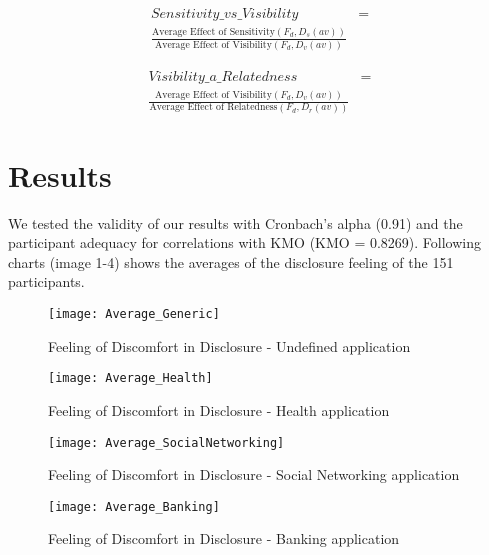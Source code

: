 \documentclass[10pt]{article}
\begin{document}
 \begin{equation} \label{eq1}
\begin{split}
Sensitivity\_vs\_Visibility & = \\ \frac{\text{Average Effect of Sensitivity}(F_{d},D_{s}(av))}{\text{Average Effect of Visibility}(F_{d},D_{v}(av)) } 
\end{split}
\end{equation}

 \begin{equation} \label{eq1}
\begin{split}
Visibility\_a\_Relatedness & = \\ \frac{\text{Average Effect of Visibility}(F_{d},D_{v}(av)) }{\text{Average Effect of Relatedness}(F_{d},D_{r}(av))} 
\end{split}
\end{equation}

\section {Results}

We tested the validity of our results with Cronbach's alpha (0.91) and the participant adequacy for correlations with KMO (KMO =  0.8269). Following charts (image 1-4) shows the averages of the disclosure feeling of the 151 participants.

\begin{figure}[h]
\begin{center}
\texttt{[image: Average\_Generic]}
\caption{Feeling of Discomfort in Disclosure - Undefined application}
\end{center}
\end{figure}

\begin{figure}[h]
\begin{center}
\texttt{[image: Average\_Health]}
\caption{Feeling of Discomfort in Disclosure - Health  application}
\end{center}
\end{figure}

\begin{figure}[h]
\begin{center}
\texttt{[image: Average\_SocialNetworking]}
\caption{Feeling of Discomfort in Disclosure - Social Networking application}
\end{center}
\end{figure}

\begin{figure}[h]
\begin{center}
\texttt{[image: Average\_Banking]}
\caption{Feeling of Discomfort in Disclosure - Banking application}
\end{center}
\end{figure}
\end{document}
